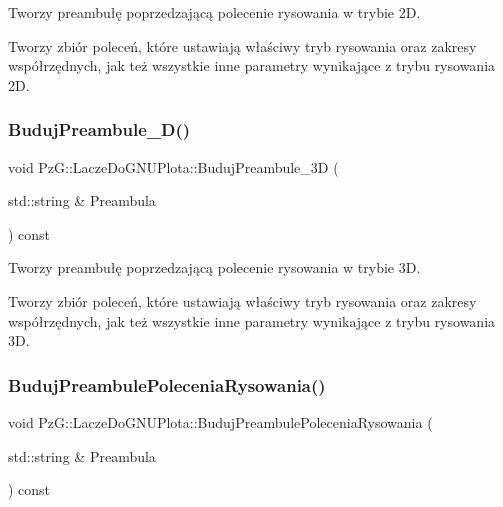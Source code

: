 Tworzy preambułę poprzedzającą polecenie rysowania w trybie 2D. 

Tworzy zbiór poleceń, które ustawiają właściwy tryb rysowania oraz zakresy współrzędnych, jak też wszystkie inne parametry wynikające z trybu rysowania 2D. \mbox{\label{classPzG_1_1LaczeDoGNUPlota_a50a544677e52829cac4dd4a95b821dcb}} 
\subsubsection{\texorpdfstring{Buduj\+Preambule\+\_\+D()}{BudujPreambule\_3D()}}
{\footnotesize\ttfamily void Pz\+G\+::\+Lacze\+Do\+G\+N\+U\+Plota\+::\+Buduj\+Preambule\+\_\+3D (\begin{DoxyParamCaption}\item[{std\+::string \&}]{Preambula }\end{DoxyParamCaption}) const\hspace{0.3cm}{\ttfamily [protected]}}



Tworzy preambułę poprzedzającą polecenie rysowania w trybie 3D. 

Tworzy zbiór poleceń, które ustawiają właściwy tryb rysowania oraz zakresy współrzędnych, jak też wszystkie inne parametry wynikające z trybu rysowania 3D. \mbox{\label{classPzG_1_1LaczeDoGNUPlota_a0da98f68f533070d5a32adbdb519cf56}} 
\subsubsection{\texorpdfstring{Buduj\+Preambule\+Polecenia\+Rysowania()}{BudujPreambulePoleceniaRysowania()}}
{\footnotesize\ttfamily void Pz\+G\+::\+Lacze\+Do\+G\+N\+U\+Plota\+::\+Buduj\+Preambule\+Polecenia\+Rysowania (\begin{DoxyParamCaption}\item[{std\+::string \&}]{Preambula }\end{DoxyParamCaption}) const\hspace{0.3cm}{\ttfamily [protected]}}




